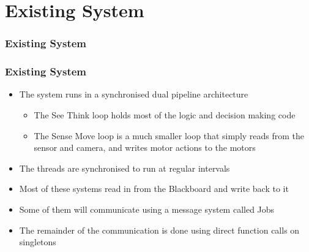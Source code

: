 \documentclass{beamer}
\begin{document}
\section{Existing System}
\begin{frame}
	\sectionpage
\end{frame}

\begin{frame}
	\frametitle{Existing System}
\end{frame}

\begin{frame}
	\frametitle{Existing System}
	\begin{itemize}
		\item The system runs in a synchronised dual pipeline architecture
			\begin{itemize}
				\item The See Think loop holds most of the logic and decision making code
				\item The Sense Move loop is a much smaller loop that simply reads from the sensor and camera, and writes motor actions to the motors
			\end{itemize}
		\item The threads are synchronised to run at regular intervals
		\item Most of these systems read in from the Blackboard and write back to it
		\item Some of them will communicate using a message system called Jobs
		\item The remainder of the communication is done using direct function calls on singletons
	\end{itemize}
\end{frame}
\end{document}

